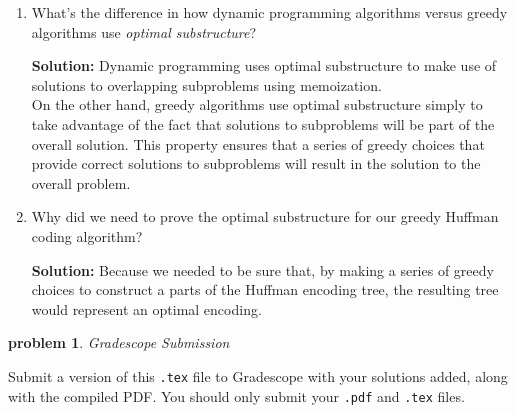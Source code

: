 \documentclass[10pt]{article}
\newcommand{\solution}[1]{\color{blue}\hfill\break\noindent\textbf{Solution:} #1\color{black}}
\newtheorem{problem}{\sc\color{cit}problem}
\begin{document}
\begin{enumerate}
\renewcommand{\theenumi}{\Alph{enumi}}

    \item What's the difference in how dynamic programming algorithms versus greedy algorithms use \emph{optimal substructure}?
    
    \solution{
        Dynamic programming uses optimal substructure to make use of solutions to overlapping subproblems using memoization. \\
        On the other hand, greedy algorithms use optimal substructure simply to take advantage of the fact that solutions to subproblems will be part of the overall solution. This property ensures that a series of greedy choices that provide correct solutions to subproblems will result in the solution to the overall problem.
    }
    \item Why did we need to prove the optimal substructure for our greedy Huffman coding algorithm?

    \solution{
        Because we needed to be sure that, by making a series of greedy choices to construct a parts of the Huffman encoding tree, the resulting tree would represent an optimal encoding.
    }
\end{enumerate}

\begin{problem} Gradescope Submission \end{problem}

Submit a version of this \verb|.tex| file to Gradescope with your solutions added, along with the compiled PDF.  You should only submit your \verb|.pdf| and \verb|.tex| files.
\end{document}
